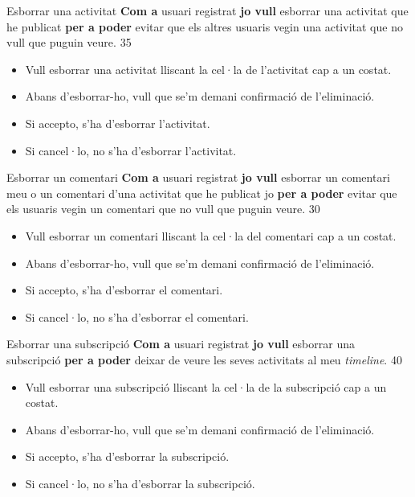 \pintaHistoria
    {Esborrar una activitat}
    {\textbf{Com a} usuari registrat \textbf{jo vull} esborrar una activitat que he publicat \textbf{per a poder} evitar que els altres usuaris vegin una activitat que no vull que puguin veure.}
    {35}
    {
    \begin{itemize}[leftmargin=0.3cm]
        \item Vull esborrar una activitat lliscant la cel·la de l'activitat cap a un costat.
        \item Abans d'esborrar-ho, vull que se'm demani confirmació de l'eliminació.
        \item Si accepto, s'ha d'esborrar l'activitat.
        \item Si cancel·lo, no s'ha d'esborrar l'activitat.
    \end{itemize}
    }
    
\pintaHistoria
    {Esborrar un comentari}
    {\textbf{Com a} usuari registrat \textbf{jo vull} esborrar un comentari meu o un comentari d'una activitat que he publicat jo \textbf{per a poder} evitar que els usuaris vegin un comentari que no vull que puguin veure.}
    {30}
    {
    \begin{itemize}[leftmargin=0.3cm]
        \item Vull esborrar un comentari lliscant la cel·la del comentari cap a un costat.
        \item Abans d'esborrar-ho, vull que se'm demani confirmació de l'eliminació.
        \item Si accepto, s'ha d'esborrar el comentari.
        \item Si cancel·lo, no s'ha d'esborrar el comentari.
    \end{itemize}
    }
    
\pintaHistoria
    {Esborrar una subscripció}
    {\textbf{Com a} usuari registrat \textbf{jo vull} esborrar una subscripció \textbf{per a poder} deixar de veure les seves activitats al meu \textit{timeline}.}
    {40}
    {
    \begin{itemize}[leftmargin=0.3cm]
        \item Vull esborrar una subscripció lliscant la cel·la de la subscripció cap a un costat.
        \item Abans d'esborrar-ho, vull que se'm demani confirmació de l'eliminació.
        \item Si accepto, s'ha d'esborrar la subscripció.
        \item Si cancel·lo, no s'ha d'esborrar la subscripció.
    \end{itemize}
    }
   
